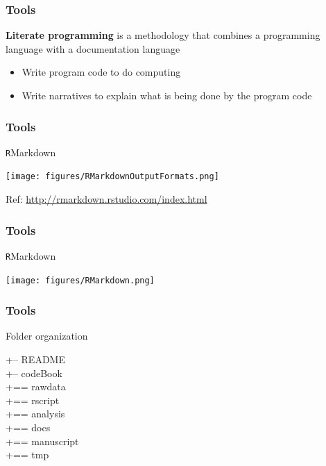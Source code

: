 \documentclass{beamer}
\begin{document}
\begin{frame}
\frametitle{Tools}
{\bf Literate programming} is a methodology that combines a programming language with a documentation language\\ 
\begin{itemize}
    \item Write program code to do computing
    \item Write narratives to explain what is being done by the program code
\end{itemize}
\end{frame}


\begin{frame}
\frametitle{Tools}
\begin{center}\Large\texttt{R}Markdown\end{center}
\begin{center}\texttt{[image: figures/RMarkdownOutputFormats.png]}\end{center}
\begin{center}\tiny Ref: {\url{http://rmarkdown.rstudio.com/index.html}}\end{center}
\end{frame}
\begin{frame}
\frametitle{Tools}
\begin{center}\Large\texttt{R}Markdown\end{center}
\begin{center}\texttt{[image: figures/RMarkdown.png]}\end{center}
\end{frame}
\begin{frame}
\frametitle{Tools}
\begin{center}\Large{\sc Folder organization}\end{center}
+-- README\\
+-- codeBook\\
+== rawdata\\
+== rscript\\
+== analysis\\
+== docs\\
+== manuscript\\
+== tmp
\end{frame}
\end{document}
